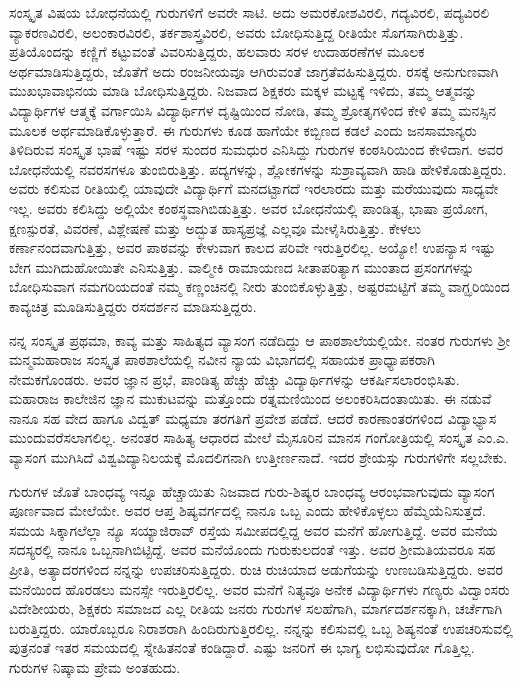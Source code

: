 ಸಂಸ್ಕೃತ ವಿಷಯ ಬೋಧನೆಯಲ್ಲಿ ಗುರುಗಳಿಗೆ ಅವರೇ ಸಾಟಿ. ಅದು ಅಮರಕೋಶವಿರಲಿ, ಗದ್ಯವಿರಲಿ, ಪದ್ಯವಿರಲಿ ವ್ಯಾಕರಣವಿರಲಿ, ಅಲಂಕಾರವಿರಲಿ, ತರ್ಕಶಾಸ್ತ್ರವಿರಲಿ, ಅವರು ಬೋಧಿಸುತ್ತಿದ್ದ ರೀತಿಯೇ ಸೊಗಸಾಗಿರುತ್ತಿತ್ತು. ಪ್ರತಿಯೊಂದನ್ನು ಕಣ್ಣಿಗೆ ಕಟ್ಟುವಂತೆ ವಿವರಿಸುತ್ತಿದ್ದರು, ಹಲವಾರು ಸರಳ ಉದಾಹರಣೆಗಳ ಮೂಲಕ ಅರ್ಥಮಾಡಿಸುತ್ತಿದ್ದರು, ಜೊತೆಗೆ ಅದು ರಂಜನೀಯವೂ ಆಗಿರುವಂತೆ ಜಾಗ್ರತೆವಹಿಸುತ್ತಿದ್ದರು. ರಸಕ್ಕೆ ಅನುಗುಣವಾಗಿ ಮುಖಭಾವಾಭಿನಯ ಮಾಡಿ ಬೋಧಿಸುತ್ತಿದ್ದರು. ನಿಜವಾದ ಶಿಕ್ಷಕರು ಮಕ್ಕಳ ಮಟ್ಟಕ್ಕೆ ಇಳಿದು, ತಮ್ಮ ಆತ್ಮವನ್ನು ವಿದ್ಯಾರ್ಥಿಗಳ ಆತ್ಮಕ್ಕೆ ವರ್ಗಾಯಿಸಿ ವಿದ್ಯಾರ್ಥಿಗಳ ದೃಷ್ಟಿಯಿಂದ ನೋಡಿ, ತಮ್ಮ ಶ್ರೋತೃಗಳಿಂದ ಕೇಳಿ ತಮ್ಮ ಮನಸ್ಸಿನ ಮೂಲಕ ಅರ್ಥಮಾಡಿಕೊಳ್ಳುತ್ತಾರೆ. ಈ ಗುರುಗಳು ಕೂಡ ಹಾಗೆಯೇ ಕಬ್ಬಿಣದ ಕಡಲೆ ಎಂದು ಜನಸಾಮಾನ್ಯರು ತಿಳಿದಿರುವ ಸಂಸ್ಕೃತ ಭಾಷೆ ಇಷ್ಟು ಸರಳ ಸುಂದರ ಸುಮಧುರ ಎನಿಸಿದ್ದು ಗುರುಗಳ ಕಂಠಸಿರಿಯಿಂದ ಕೇಳಿದಾಗ. ಅವರ ಬೋಧನೆಯಲ್ಲಿ ನವರಸಗಳೂ ತುಂಬಿರುತ್ತಿತ್ತು. ಪದ್ಯಗಳನ್ನು, ಶ್ಲೋಕಗಳನ್ನು ಸುಶ್ರಾವ್ಯವಾಗಿ ಹಾಡಿ ಹೇಳಿಕೊಡುತ್ತಿದ್ದರು. ಅವರು ಕಲಿಸುವ ರೀತಿಯಲ್ಲಿ ಯಾವುದೇ ವಿದ್ಯಾರ್ಥಿಗೆ ಮನದಟ್ಟಾಗದೆ ಇರಲಾರದು ಮತ್ತು ಮರೆಯುವುದು ಸಾಧ್ಯವೇ ಇಲ್ಲ. ಅವರು ಕಲಿಸಿದ್ದು ಅಲ್ಲಿಯೇ ಕಂಠಸ್ಥವಾಗಿಬಿಡುತ್ತಿತ್ತು. ಅವರ ಬೋಧನೆಯಲ್ಲಿ ಪಾಂಡಿತ್ಯ, ಭಾಷಾ ಪ್ರಯೋಗ, ಕ್ಷಣಸ್ಪುರತೆ, ವಿವರಣೆ, ವಿಶ್ಲೇಷಣೆ ಮತ್ತು ಅದ್ಭುತ ಹಾಸ್ಯಪ್ರಜ್ಞೆ ಎಲ್ಲವೂ ಮೇಳೈಸಿರುತ್ತಿತ್ತು. ಕೇಳಲು ಕರ್ಣಾನಂದವಾಗುತ್ತಿತ್ತು, ಅವರ ಪಾಠವನ್ನು ಕೇಳುವಾಗ ಕಾಲದ ಪರಿವೇ ಇರುತ್ತಿರಲಿಲ್ಲ. ಅಯ್ಯೋ! ಉಪನ್ಯಾಸ ಇಷ್ಟು ಬೇಗ ಮುಗಿದುಹೋಯಿತೇ ಎನಿಸುತ್ತಿತ್ತು. ವಾಲ್ಮೀಕಿ ರಾಮಾಯಣದ ಸೀತಾಪರಿತ್ಯಾಗ ಮುಂತಾದ ಪ್ರಸಂಗಗಳನ್ನು ಬೋಧಿಸುವಾಗ ನಮಗರಿಯದಂತೆ ನಮ್ಮ ಕಣ್ಣಂಚಿನಲ್ಲಿ ನೀರು ತುಂಬಿಕೊಳ್ಳುತ್ತಿತ್ತು, ಅಷ್ಟರಮಟ್ಟಿಗೆ ತಮ್ಮ ವಾಗ್ಝರಿಯಿಂದ ಕಾವ್ಯಚಿತ್ರ ಮೂಡಿಸುತ್ತಿದ್ದರು ರಸದರ್ಶನ ಮಾಡಿಸುತ್ತಿದ್ದರು.

ನನ್ನ ಸಂಸ್ಕೃತ ಪ್ರಥಮಾ, ಕಾವ್ಯ ಮತ್ತು ಸಾಹಿತ್ಯದ ವ್ಯಾಸಂಗ ನಡೆದಿದ್ದು ಆ ಪಾಠಶಾಲೆಯಲ್ಲಿಯೇ. ನಂತರ ಗುರುಗಳು ಶ್ರೀ ಮನ್ಮಮಹಾರಾಜ ಸಂಸ್ಕೃತ ಪಾಠಶಾಲೆಯಲ್ಲಿ ನವೀನ ನ್ಯಾಯ ವಿಭಾಗದಲ್ಲಿ ಸಹಾಯಕ ಪ್ರಾಧ್ಯಾಪಕರಾಗಿ ನೇಮಕಗೊಂಡರು. ಅವರ ಜ್ಞಾನ ಪ್ರಭೆ, ಪಾಂಡಿತ್ಯ ಹೆಚ್ಚು ಹೆಚ್ಚು ವಿದ್ಯಾರ್ಥಿಗಳನ್ನು ಆಕರ್ಷಿಸಲಾರಂಭಿಸಿತು. ಮಹಾರಾಜ ಕಾಲೇಜಿನ ಜ್ಞಾನ ಮುಕುಟವನ್ನು ಮತ್ತೊಂದು ರತ್ನಮಣಿಯಿಂದ ಅಲಂಕರಿಸಿದಂತಾಯಿತು. ಈ ನಡುವೆ ನಾನೂ ಸಹ ವೇದ ಹಾಗೂ ವಿದ್ವತ್ ಮಧ್ಯಮಾ ತರಗತಿಗೆ ಪ್ರವೇಶ ಪಡೆದೆ. ಆದರೆ ಕಾರಣಾಂತರಗಳಿಂದ ವಿದ್ಯಾಭ್ಯಾಸ ಮುಂದುವರೆಸಲಾಗಲಿಲ್ಲ. ಅನಂತರ ಸಾಹಿತ್ಯ ಆಧಾರದ ಮೇಲೆ ಮೈಸೂರಿನ ಮಾನಸ ಗಂಗೋತ್ರಿಯಲ್ಲಿ ಸಂಸ್ಕೃತ ಎಂ.ಎ. ವ್ಯಾಸಂಗ ಮುಗಿಸಿದೆ ವಿಶ್ವವಿದ್ಯಾನಿಲಯಕ್ಕೆ ಮೊದಲಿಗನಾಗಿ ಉತ್ತೀರ್ಣನಾದೆ. ಇದರ ಶ್ರೇಯಸ್ಸು ಗುರುಗಳಿಗೇ ಸಲ್ಲಬೇಕು.

ಗುರುಗಳ ಜೊತೆ ಬಾಂಧವ್ಯ ಇನ್ನೂ ಹೆಚ್ಚಾಯಿತು ನಿಜವಾದ ಗುರು-ಶಿಷ್ಯರ ಬಾಂಧವ್ಯ ಆರಂಭವಾಗುವುದು ವ್ಯಾಸಂಗ ಪೂರ್ಣವಾದ ಮೇಲೆಯೇ. ಅವರ ಆಪ್ತ ಶಿಷ್ಯವರ್ಗದಲ್ಲಿ ನಾನೂ ಒಬ್ಬ ಎಂದು ಹೇಳಿಕೊಳ್ಳಲು ಹೆಮ್ಮೆಯೆನಿಸುತ್ತದೆ. ಸಮಯ ಸಿಕ್ಕಾಗಲೆಲ್ಲಾ ನ್ಯೂ ಸಯ್ಯಾಜಿರಾವ್ ರಸ್ತೆಯ ಸಮೀಪದಲ್ಲಿದ್ದ ಅವರ ಮನೆಗೆ ಹೋಗುತ್ತಿದ್ದೆ. ಅವರ ಮನೆಯ ಸದಸ್ಯರಲ್ಲಿ ನಾನೂ ಒಬ್ಬನಾಗಿಬಿಟ್ಟಿದ್ದೆ. ಅವರ ಮನೆಯೊಂದು ಗುರುಕುಲದಂತೆ ಇತ್ತು. ಅವರ ಶ್ರೀಮತಿಯವರೂ ಸಹ ಪ್ರೀತಿ, ಅತ್ಯಾದರಗಳಿಂದ ನನ್ನನ್ನು ಉಪಚರಿಸುತ್ತಿದ್ದರು. ರುಚಿ ರುಚಿಯಾದ ಅಡುಗೆಯನ್ನು ಉಣಬಡಿಸುತ್ತಿದ್ದರು. ಅವರ ಮನೆಯಿಂದ ಹೊರಡಲು ಮನಸ್ಸೇ ಇರುತ್ತಿರಲಿಲ್ಲ. ಅವರ ಮನೆಗೆ ನಿತ್ಯವೂ ಅನೇಕ ವಿದ್ಯಾರ್ಥಿಗಳು ಗಣ್ಯರು ವಿದ್ವಾಂಸರು ವಿದೇಶೀಯರು, ಶಿಕ್ಷಕರು ಸಮಾಜದ ಎಲ್ಲ ರೀತಿಯ ಜನರು ಗುರುಗಳ ಸಲಹೆಗಾಗಿ, ಮಾರ್ಗದರ್ಶನಕ್ಕಾಗಿ, ಚರ್ಚೆಗಾಗಿ ಬರುತ್ತಿದ್ದರು. ಯಾರೊಬ್ಬರೂ ನಿರಾಶರಾಗಿ ಹಿಂದಿರುಗುತ್ತಿರಲಿಲ್ಲ. ನನ್ನನ್ನು ಕಲಿಸುವಲ್ಲಿ ಒಬ್ಬ ಶಿಷ್ಯನಂತೆ ಉಪಚರಿಸುವಲ್ಲಿ ಪುತ್ರನಂತೆ ಇತರ ಸಮಯದಲ್ಲಿ ಸ್ನೇಹಿತನಂತೆ ಕಂಡಿದ್ದಾರೆ. ಎಷ್ಟು ಜನರಿಗೆ ಈ ಭಾಗ್ಯ ಲಭಿಸುವುದೋ ಗೊತ್ತಿಲ್ಲ. ಗುರುಗಳ ನಿಷ್ಕಾಮ ಪ್ರೇಮ ಅಂತಹುದು.

